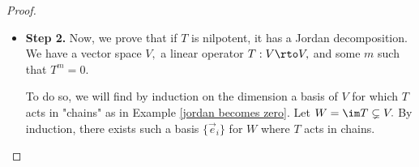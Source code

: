 \begin{proof}
\begin{itemize}
        Let 
    \[
    U \coloneqq T^mV = \im(T^m)
    \text{ and }
    W = \ker(T^m).
    \]
    
    First, $T$ is nilpotent on $W$ because $W = \ker(T^m),$ so $(T |_W)^m = 0$, which is the definition of being nilpotent. Also, $T|_U$ is invertible because $U = \im(T|_U)$, so $T|_U$ is surjective from $U$ to itself, which implies that it is invertible. Lastly, $W \cap U = \{v \in U: T^m = 0\},$ by definition, which is precisely the zero vector, because $T$ is invertible on $U$ so it maps only the zero vector to the zero vector. Using the rank-nullity theorem, $\dim \ker T^m + \dim \im T^m = \dim V, $ so by Theorem \ref{splitting thm}, $W \oplus U$ is in fact a splitting.
    
    \item \textbf{Step 2.} Now, we prove that if $T$ is nilpotent, it has a Jordan decomposition. We have a vector space $V,$ a linear operator $T: V \rto V,$ and some $m$ such that $T^m = 0.$
    
    To do so, we will find by induction on the dimension a basis of $V$ for which $T$ acts in "chains" as in Example \ref{jordan becomes zero}. Let $W = \im T \subsetneq V.$ By induction, there exists such a basis $\{\vec{e}_i\}$ for $W$ where $T$ acts in chains.
    

\end{itemize}
\end{proof}

